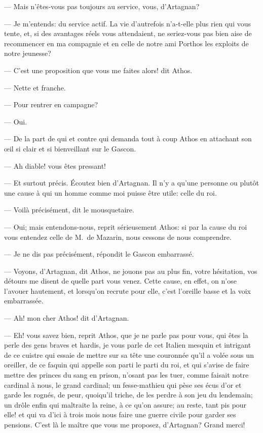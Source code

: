 — Mais n'êtes-vous pas toujours au service, vous, d'Artagnan?

— Je m'entends: du service actif. La vie d'autrefois n'a-t-elle plus rien qui vous tente, et, si des avantages réels vous attendaient, ne seriez-vous pas bien aise de recommencer en ma compagnie et en celle de notre ami Porthos les exploits de notre jeunesse?

— C'est une proposition que vous me faites alors! dit Athos.

— Nette et franche.

— Pour rentrer en campagne?

— Oui.

— De la part de qui et contre qui demanda tout à coup Athos en attachant son œil si clair et si bienveillant sur le Gascon.

— Ah diable! vous êtes pressant!

— Et surtout précis. Écoutez bien d'Artagnan. Il n'y a qu'une personne ou plutôt une cause à qui un homme comme moi puisse être utile: celle du roi.

— Voilà précisément, dit le mousquetaire.

— Oui; mais entendons-nous, reprit sérieusement Athos: si par la cause du roi vous entendez celle de M.~de Mazarin, nous cessons de nous comprendre.

— Je ne dis pas précisément, répondit le Gascon embarrassé.

— Voyons, d'Artagnan, dit Athos, ne jouons pas au plus fin, votre hésitation, vos détours me disent de quelle part vous venez. Cette cause, en effet, on n'ose l'avouer hautement, et lorsqu'on recrute pour elle, c'est l'oreille basse et la voix embarrassée.

— Ah! mon cher Athos! dit d'Artagnan.

— Eh! vous savez bien, reprit Athos, que je ne parle pas pour vous, qui êtes la perle des gens braves et hardis, je vous parle de cet Italien mesquin et intrigant de ce cuistre qui essaie de mettre sur sa tête une couronnée qu'il a volée sous un oreiller, de ce faquin qui appelle son parti le parti du roi, et qui s'avise de faire mettre des princes du sang en prison, n'osant pas les tuer, comme faisait notre cardinal à nous, le grand cardinal; un fesse-mathieu qui pèse ses écus d'or et garde les rognés, de peur, quoiqu'il triche, de les perdre à son jeu du lendemain; un drôle enfin qui maltraite la reine, à ce qu'on assure; au reste, tant pis pour elle! et qui va d'ici à trois mois nous faire une guerre civile pour garder ses pensions. C'est là le maître que vous me proposez, d'Artagnan? Grand merci!

